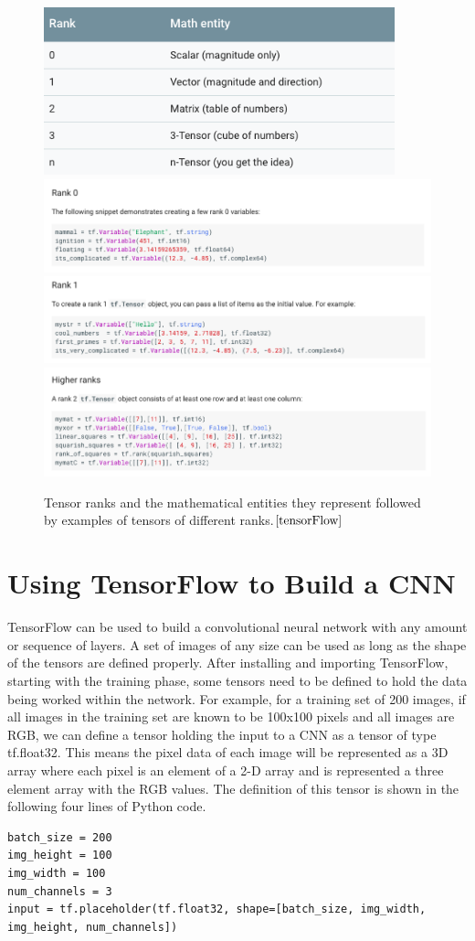 \documentclass[12pt]{report} %
\begin{document}
\begin{figure}
\centering
\includegraphics[width=4in]{tf_rank}
\includegraphics[width=7in]{rank0}
\includegraphics[width=7in]{rank2}
\includegraphics[width=7in]{rank1}
\caption{Tensor ranks and the mathematical entities they represent followed by examples of tensors of different ranks.$\cite{tensorFlow}$}
\end{figure}	
\section{Using TensorFlow to Build a CNN}
	TensorFlow can be used to build a convolutional neural network with any amount or sequence of layers. A set of images of any size can be used as long as the shape of the tensors are defined properly. After installing and importing TensorFlow, starting with the training phase, some tensors need to be defined to hold the data being worked within the network. For example, for a training set of 200 images, if all images in the training set are known to be 100x100 pixels and all images are RGB, we can define a tensor holding the input to a CNN as a tensor of type tf.float32. This means the pixel data of each image will be represented as a 3D array where each pixel is an element of a 2-D array and is represented a three element array with the RGB values. The definition of this tensor is shown in the following four lines of Python code.
\begin{verbatim}
batch_size = 200
img_height = 100
img_width = 100
num_channels = 3
input = tf.placeholder(tf.float32, shape=[batch_size, img_width, img_height, num_channels])
\end{verbatim}
\end{document}
